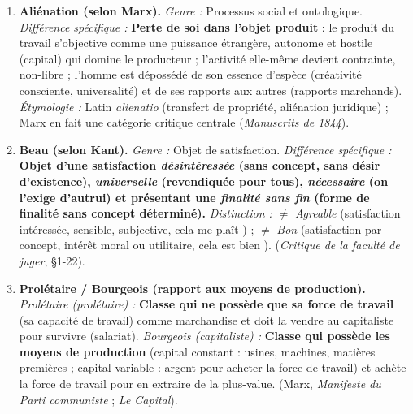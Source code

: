 \documentclass[11pt]{article}
\begin{document}
\begin{corrige}
\begin{enumerate}
\item \textbf{Aliénation (selon Marx).} \emph{Genre :} Processus social et ontologique. \emph{Différence spécifique :} \textbf{Perte de soi dans l'objet produit} : le produit du travail s'objective comme une puissance étrangère, autonome et hostile (capital) qui domine le producteur ; l'activité elle-même devient contrainte, non-libre ; l'homme est dépossédé de son essence d'espèce (créativité consciente, universalité) et de ses rapports aux autres (rapports marchands). \emph{Étymologie :} Latin \emph{alienatio} (transfert de propriété, aliénation juridique) ; Marx en fait une catégorie critique centrale (\emph{Manuscrits de 1844}).
\item \textbf{Beau (selon Kant).} \emph{Genre :} Objet de satisfaction. \emph{Différence spécifique :} \textbf{Objet d'une satisfaction \emph{désintéressée} (sans concept, sans désir d'existence), \emph{universelle} (revendiquée pour tous), \emph{nécessaire} (on l'exige d'autrui) et présentant une \emph{finalité sans fin} (forme de finalité sans concept déterminé).} \emph{Distinction :} $\neq$ \emph{Agreable} (satisfaction intéressée, sensible, subjective, \guillemotleft cela me plaît \guillemotright) ; $\neq$ \emph{Bon} (satisfaction par concept, intérêt moral ou utilitaire, \guillemotleft cela est bien \guillemotright). (\emph{Critique de la faculté de juger}, §1-22).
\item \textbf{Prolétaire / Bourgeois (rapport aux moyens de production).} \emph{Prolétaire (prolétaire) :} \textbf{Classe qui ne possède que sa force de travail} (sa capacité de travail) comme marchandise et doit la vendre au capitaliste pour survivre (salariat). \emph{Bourgeois (capitaliste) :} \textbf{Classe qui possède les moyens de production} (capital constant : usines, machines, matières premières ; capital variable : argent pour acheter la force de travail) et achète la force de travail pour en extraire de la plus-value. (Marx, \emph{Manifeste du Parti communiste} ; \emph{Le Capital}).
\end{enumerate}
\end{corrige}
\end{document}
